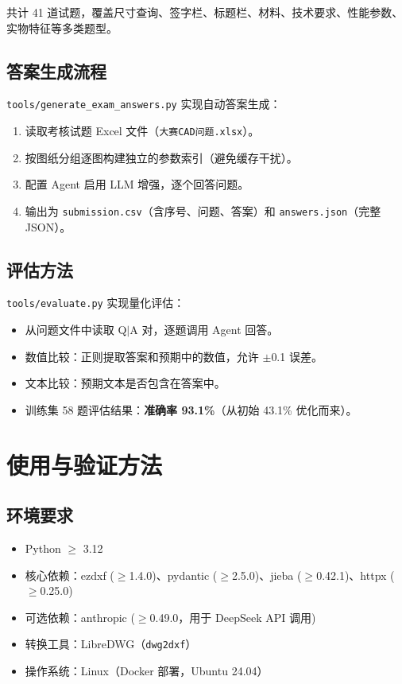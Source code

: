 \documentclass[11pt,a4paper]{article}
\begin{document}
共计 41 道试题，覆盖尺寸查询、签字栏、标题栏、材料、技术要求、性能参数、实物特征等多类题型。

\subsection{答案生成流程}

\texttt{tools/generate\_exam\_answers.py} 实现自动答案生成：

\begin{enumerate}[nosep]
  \item 读取考核试题 Excel 文件（\texttt{大赛CAD问题.xlsx}）。
  \item 按图纸分组逐图构建独立的参数索引（避免缓存干扰）。
  \item 配置 Agent 启用 LLM 增强，逐个回答问题。
  \item 输出为 \texttt{submission.csv}（含序号、问题、答案）和 \texttt{answers.json}（完整 JSON）。
\end{enumerate}

\subsection{评估方法}

\texttt{tools/evaluate.py} 实现量化评估：

\begin{itemize}[nosep]
  \item 从问题文件中读取 Q$\mid$A 对，逐题调用 Agent 回答。
  \item 数值比较：正则提取答案和预期中的数值，允许 $\pm$0.1 误差。
  \item 文本比较：预期文本是否包含在答案中。
  \item 训练集 58 题评估结果：\textbf{准确率 93.1\%}（从初始 43.1\% 优化而来）。
\end{itemize}

\section{使用与验证方法}

\subsection{环境要求}

\begin{itemize}[nosep]
  \item Python $\ge$ 3.12
  \item 核心依赖：ezdxf ($\ge$1.4.0)、pydantic ($\ge$2.5.0)、jieba ($\ge$0.42.1)、httpx ($\ge$0.25.0)
  \item 可选依赖：anthropic ($\ge$0.49.0，用于 DeepSeek API 调用)
  \item 转换工具：LibreDWG（\texttt{dwg2dxf}）
  \item 操作系统：Linux（Docker 部署，Ubuntu 24.04）
\end{itemize}
\end{document}
